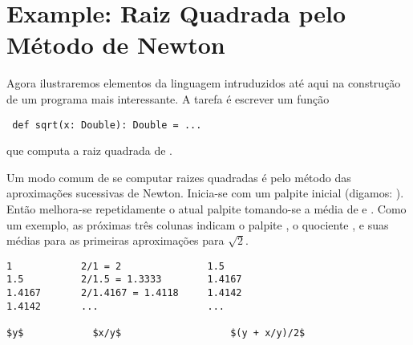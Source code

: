 
\section{\label{sec:sqrt}Example: Raiz Quadrada pelo M\'{e}todo de Newton}
Agora ilustraremos elementos da linguagem intruduzidos at\'{e} aqui na
constru\c{c}\~{a}o de um programa mais interessante. A tarefa \'{e} escrever um fun\c{c}\~{a}o  
 \begin{lstlisting}
 def sqrt(x: Double): Double = ...
 \end{lstlisting}
que computa a raiz quadrada de . 

Um modo comum de se computar raizes quadradas \'{e} pelo m\'{e}todo das aproxima\c{c}\~{o}es
sucessivas de Newton. Inicia-se com um palpite inicial  (digamos:
). Ent\~{a}o melhora-se repetidamente o atual palpite  
tomando-se a m\'{e}dia de  e . Como um exemplo, as pr\'{o}ximas
tr\^{e}s colunas indicam o palpite , o quociente , e suas
m\'{e}dias para as primeiras aproxima\c{c}\~{o}es para $\sqrt 2$.       

\begin{lstlisting}
1            2/1 = 2               1.5
1.5          2/1.5 = 1.3333        1.4167
1.4167       2/1.4167 = 1.4118     1.4142
1.4142       ...                   ...

$y$            $x/y$                   $(y + x/y)/2$
\end{lstlisting}


